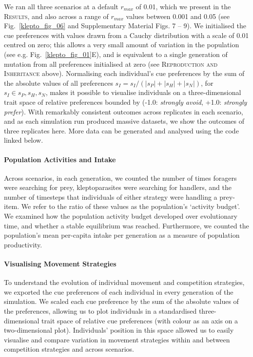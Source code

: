 We ran all three scenarios at a default $r_{max}$ of 0.01, which we present in the \textsc{Results}, and also across a range of $r_{max}$ values between 0.001 and 0.05 (see Fig.~\ref{klepto_fig_06} and Supplementary Material Figs. 7 -- 9).
We initialised the cue preferences with values drawn from a Cauchy distribution with a scale of 0.01 centred on zero; this allows a very small amount of variation in the population (see e.g. Fig.~\ref{klepto_fig_01}E), and is equivalent to a single generation of mutation from all preferences initialised at zero (see \textsc{Reproduction and Inheritance} above).
Normalising each individual's cue preferences by the sum of the absolute values of all preferences $s_I = s_I / (|s_P| + |s_H| + |s_N|)$, for $s_I \in s_P, s_H, s_N$, makes it possible to visualise individuals on a three-dimensional trait space of relative preferences bounded by (-1.0: \textit{strongly avoid}, +1.0: \textit{strongly prefer}).
With remarkably consistent outcomes across replicates in each scenario, and as each simulation run produced massive datasets, we show the outcomes of three replicates here.
More data can be generated and analysed using the code linked below.

\paragraph{Population Activities and Intake}

Across scenarios, in each generation, we counted the number of times foragers were searching for prey, kleptoparasites were searching for handlers, and the number of timesteps that individuals of either strategy were handling a prey-item.
We refer to the ratio of these values as the population's `activity budget'.
We examined how the population activity budget developed over evolutionary time, and whether a stable equilibrium was reached.
Furthermore, we counted the population's mean per-capita intake per generation as a measure of population productivity.

\paragraph{Visualising Movement Strategies}

To understand the evolution of individual movement and competition strategies, we exported the cue preferences of each individual in every generation of the simulation.
We scaled each cue preference by the sum of the absolute values of the preferences, allowing us to plot individuals in a standardised three-dimensional trait space of relative cue preferences (with colour as an axis on a two-dimensional plot).
Individuals' position in this space allowed us to easily visualise and compare variation in movement strategies within and between competition strategies and across scenarios.


